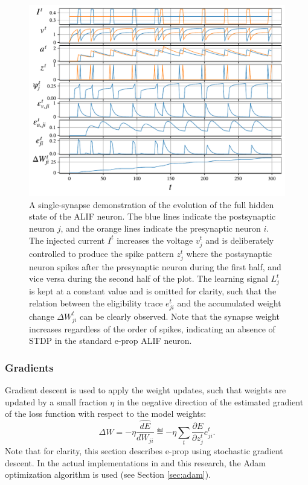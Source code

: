            \begin{figure}[ht]
                \centering
                \includegraphics[width=\linewidth]{gfx/alif}
                \caption[Single-synapse ALIF demo.]{A single-synapse demonstration of the evolution of the full hidden state of the ALIF neuron. The blue lines indicate the postsynaptic neuron $j$, and the orange lines indicate the presynaptic neuron $i$. The injected current $I^t$ increases the voltage $v^t_j$ and is deliberately controlled to produce the spike pattern $z^t_j$ where the postsynaptic neuron spikes after the presynaptic neuron during the first half, and vice versa during the second half of the plot. The learning signal $L^t_j$ is kept at a constant value and is omitted for clarity, such that the relation between the eligibility trace $e^t_{ji}$ and the accumulated weight change $\Delta W^t_{ji}$ can be clearly observed. Note that the synapse weight increases regardless of the order of spikes, indicating an absence of STDP in the standard e-prop ALIF neuron.}
                \label{fig:alif}
            \end{figure}

        \subsubsection{Gradients}\label{sec:eprop_grd}
            Gradient descent is used to apply the weight updates, such that weights are updated by a small fraction $\eta$ in the negative direction of the estimated gradient of the loss function with respect to the model weights:
            \begin{equation}\label{eq:eprop_grd}
                \Delta W = -\eta\widehat{\frac{dE}{dW_{ji}}} \eqdef -\eta\sum_t\frac{\partial E}{\partial z^t_j}e^t_{ji}.
            \end{equation}
            Note that for clarity, this section describes e-prop using stochastic gradient descent.
            In the actual implementations in \citet{bellec2020solution} and this research, the Adam optimization algorithm \citep{kingma2014adam} is used (see Section \ref{sec:adam}).

